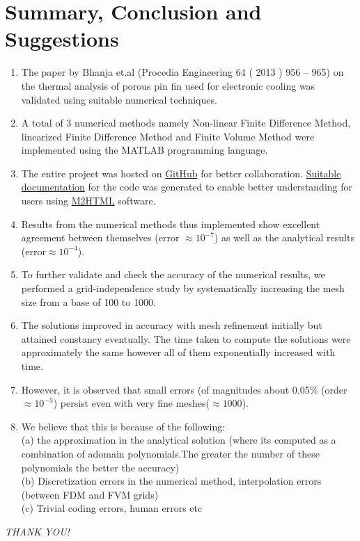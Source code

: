 \documentclass[12pt]{article}
\begin{document}
\section{Summary, Conclusion and Suggestions}
\begin{enumerate}
    \item The paper by Bhanja et.al (Procedia Engineering 64 ( 2013 ) 956 – 965) on the thermal analysis of porous pin fin used for electronic cooling was validated using suitable numerical techniques.
    \item A total of 3 numerical methods namely Non-linear Finite Difference Method, linearized Finite Difference Method and Finite Volume Method were implemented using the MATLAB programming language.
    \item The entire project was hosted on \href{https://bit.ly/3gPOgPN}{GitHub} for better collaboration. \href{https://rsuryanarayan.github.io/CFD_Documentation/}{Suitable documentation} for the code was generated to enable better understanding for users using \href{https://www.artefact.tk/software/matlab/m2html/}{M2HTML} software.
    \item Results from the numerical methods thus implemented show excellent agreement between themselves (error $\approx10^{-7}$) as well as the analytical results (error$\approx10^{-4}$).
    \item To further validate and check the accuracy of the numerical results, we performed a grid-independence study by systematically increasing the mesh size from a base of 100 to 1000.
    \item The solutions improved in accuracy with mesh refinement initially but attained constancy eventually. The time taken to compute the solutions were approximately the same however all of them exponentially increased with time.
    \item However, it is observed that small errors (of magnitudes about 0.05\% (order $\approx10^{-5}$) persist even with very fine meshes($\approx1000$).
    \item We believe that this is because of the following: \\
    (a) the approximation in the analytical solution (where its computed as a combination of adomain polynomials.The greater the number of these polynomials the better the accuracy) \\
    (b) Discretization errors in the numerical method, interpolation errors (between FDM and FVM grids)\\
    (c) Trivial coding errors, human errors etc 
\end{enumerate}
\begin{center}
    \emph{THANK YOU!}
\end{center}
%
%
\end{document}
